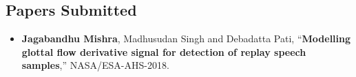 \begin{spacing}{1.5}
\subsection*{Papers Submitted}
\begin{itemize}
\item \textbf{Jagabandhu Mishra}, Madhusudan Singh and Debadatta Pati, \textquotedblleft{}\textbf{Modelling glottal flow derivative signal for
detection of replay speech samples},''
NASA/ESA-AHS-2018.
\end{itemize}


\bigskip{}


\noindent

\end{spacing} 